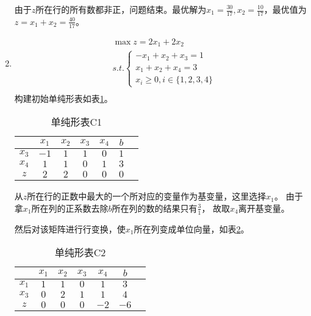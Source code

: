 \begin{solution}
\begin{enumerate}
      由于$z$所在行的所有数都非正，问题结束。最优解为$x_1=\frac{30}{17},x_2=\frac{10}{17}$，最优值为$z = x_1 + x_2=\frac{40}{17}$。
      \item 
      \begin{align*}
         &\max z = 2x_1 + 2x_2\\
         &s.t. \begin{cases}
            -x_1 + x_2 + x_3 = 1\\
            x_1 + x_2 + x_4 = 3\\
            x_i \ge 0, i \in \{1,2,3,4\}
        \end{cases}\\
      \end{align*}
      构建初始单纯形表如表\ref{tc1}。
      \begin{table}[!h]
         \centering
         \caption{单纯形表C1}
         \label{tc1}
         \begin{tabular}{c|cccccc} 
         \toprule
                &$x_1$  &$x_2$  &$x_3$  &$x_4$  &$b$   \\\hline
         $x_3$  &$-1$   &$1$    &$1$    &$0$    &$1$   \\
         $x_4$  &$1$    &$1$    &$0$    &$1$    &$3$   \\
         $z$    &$2$    &$2$    &$0$    &$0$    &$0$   \\
         \bottomrule
         \end{tabular}
      \end{table}

      从$z$所在行的正数中最大的一个所对应的变量作为基变量，这里选择$x_1$。
      由于拿$x_1$所在列的正系数去除$b$所在列的数的结果只有$\frac{3}{1}$，
      故取$x_{4}$离开基变量。

      然后对该矩阵进行行变换，使$x_1$所在列变成单位向量，如表\ref{tc2}。

      \begin{table}[!h]
         \centering
         \caption{单纯形表C2}
         \label{tc2}
         \begin{tabular}{c|cccccc} 
         \toprule
                &$x_1$  &$x_2$  &$x_3$  &$x_4$  &$b$   \\\hline
         $x_1$  &$1$    &$1$    &$0$    &$1$    &$3$   \\
         $x_3$  &$0$    &$2$    &$1$    &$1$    &$4$   \\
         $z$    &$0$    &$0$    &$0$    &$-2$    &$-6$   \\
         \bottomrule
         \end{tabular}
      \end{table}


\end{enumerate}
\end{solution}
